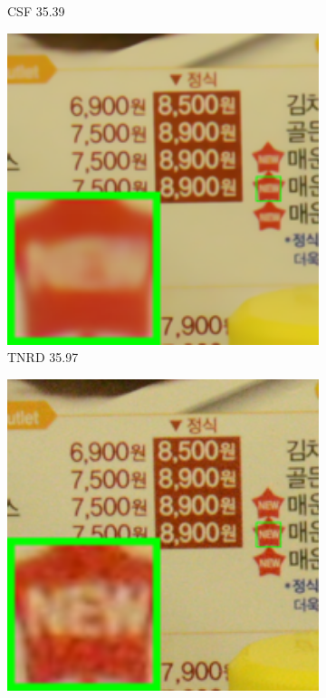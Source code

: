\begin{figure}
\begin{subfigure}[t]{0.19\textwidth}
		\caption{CSF 35.39}
    \end{subfigure}
    \hfill
    \begin{subfigure}[t]{0.19\textwidth}
        \centering
        \includegraphics[width=1\textwidth]{images/guided/resize_br_TRD_CC_Noisy_Nikon_D800_ISO_3200_A3_66.png}
		\caption{TNRD 35.97}
    \end{subfigure}
    \hfill
    \begin{subfigure}[t]{0.19\textwidth}
        \centering
        \includegraphics[width=1\textwidth]{images/guided/resize_br_DnCNN_CC_Noisy_Nikon_D800_ISO_3200_A3_66.png}

\end{subfigure}
\end{figure}
